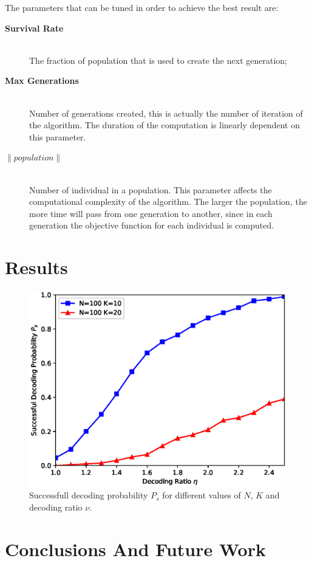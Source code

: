\documentclass[journal]{IEEEtran}
\newcommand{\norm}[1]{\left\lVert#1\right\rVert}
\begin{document}
The parameters that can be tuned in order to achieve the best result are:
\begin{description}
	\item[\textbf{Survival Rate}] \hfill \\
	The fraction of population that is used to create the next generation;
	\item[\textbf{Max Generations}] \hfill \\
	Number of generations created, this is actually the number of iteration of the algorithm. The duration of the computation is linearly dependent on this parameter.
	\item[$\norm{population}$] \hfill \\
	Number of individual in a population. This parameter affects the computational complexity of the algorithm. The larger the population, the more time will pass from one generation to another, since in each generation the objective function for each individual is computed.
\end{description}

\section{Results}
\label{sec:results}
\begin{figure}
  \centering
	    \includegraphics[width=0.9\columnwidth]{ratiovsprob.eps}
  \caption{Successfull decoding probability $P_s$ for different values of $N$, $K$ and decoding ratio $\nu$.}
  \label{fig:ratiovsprob}
\end{figure}

\section{Conclusions And Future Work}
\label{sec:conclusions}



\end{document}
